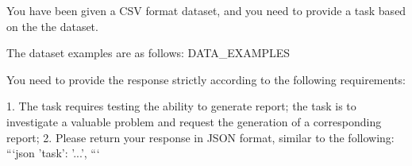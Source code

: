 
\begin{tcolorbox}[colback=cadmiumgreen!5!white,colframe=forestgreen!75!white,breakable,title=\textit{Prompt for task construction in reporting.}]
\begin{VerbatimWrap}
You have been given a CSV format dataset, and you need to provide a task based on the the dataset.

The dataset examples are as follows:
{{DATA_EXAMPLES}}

You need to provide the response strictly according to the following requirements:

1. The task requires testing the ability to generate report; the task is to investigate a valuable problem and request the generation of a corresponding report;
2. Please return your response in JSON format, similar to the following:
```json
{
    'task': '...',
}
```
\end{VerbatimWrap}
\end{tcolorbox}
